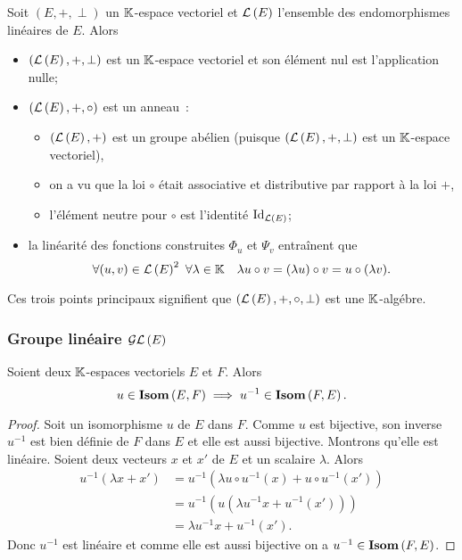 Soit \((E,+,\perp)\) un \(\mathbb{K}\)-espace vectoriel et \(\mathcal{L}\left(E\right)\) l'ensemble des endomorphismes linéaires de \(E\). Alors
\begin{itemize}
\item \((\mathcal{L}\left(E\right),+,\perp)\) est un \(\mathbb{K}\)-espace vectoriel et son élément nul est l'application nulle;
\item \((\mathcal{L}\left(E\right), +, \circ)\) est un anneau~:
  \begin{itemize}
  \item \((\mathcal{L}\left(E\right),+)\) est un groupe abélien (puisque \((\mathcal{L}\left(E\right),+,\perp)\) est un \(\mathbb{K}\)-espace vectoriel),
  \item on a vu que la loi \(\circ\) était associative et distributive par rapport à la loi \(+\),
  \item l'élément neutre pour \(\circ\) est l'identité \(\operatorname{Id}_{\mathcal{L}\left(E\right)}\);
  \end{itemize}
\item la linéarité des fonctions construites \(\Phi_u\) et \(\Psi_v\) entraînent que
  \begin{equation}
    \forall (u,v) \in \mathcal{L}\left(E\right)^2 \ \forall \lambda \in \mathbb{K} \quad \lambda u \circ v = (\lambda u) \circ v = u \circ (\lambda v).
  \end{equation}
\end{itemize}

Ces trois points principaux signifient que \((\mathcal{L}\left(E\right),+,\circ, \perp)\) est une \(\mathbb{K}\)-algébre.

\subsubsection{Groupe linéaire \(\mathcal{GL}\left(E\right)\)}

\begin{theo}
  Soient deux \(\mathbb{K}\)-espaces vectoriels \(E\) et \(F\). Alors
  \begin{equation}
    u \in \mathbf{Isom}\left(E,F\right) \implies u^{-1} \in \mathbf{Isom}\left(F,E\right).
  \end{equation}
\end{theo}
\begin{proof}
  Soit un isomorphisme \(u\) de \(E\) dans \(F\). Comme \(u\) est bijective, son inverse \(u^{-1}\) est bien définie de \(F\) dans \(E\) et elle est aussi bijective. Montrons qu'elle est linéaire. Soient deux vecteurs \(x\) et \(x'\) de \(E\) et un scalaire \(\lambda\). Alors
  \begin{align}
    u^{-1}(\lambda x+x') &= u^{-1}(\lambda u\circ u^{-1} (x) + u \circ u^{-1}(x')) \\
    &=u^{-1}(u(\lambda u^{-1} x +u^{-1}(x'))) \\
    &=\lambda u^{-1} x +u^{-1}(x').
  \end{align}
  Donc \(u^{-1}\) est linéaire et comme elle est aussi bijective on a \(u^{-1} \in \mathbf{Isom}\left(F,E\right)\).
\end{proof}

